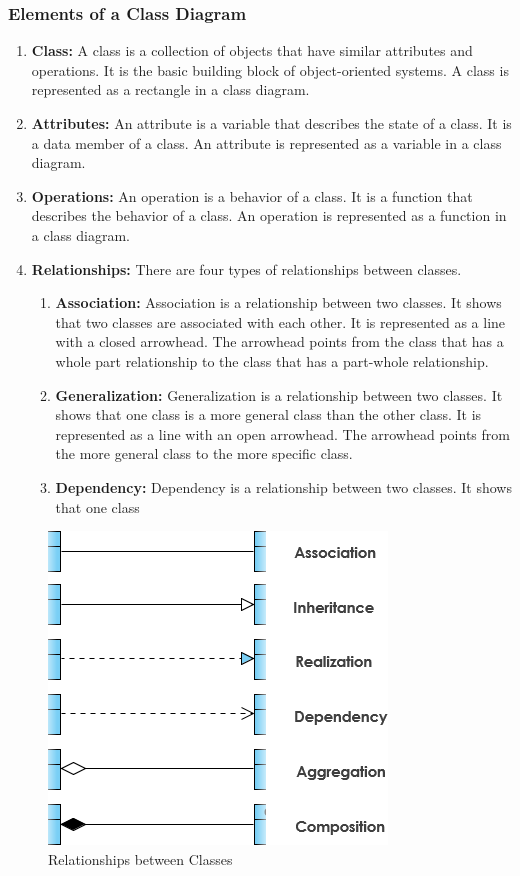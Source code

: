 \documentclass[11pt]{article}
\begin{document}
\subsubsection{Elements of a Class Diagram}

\begin{enumerate}
	\item \textbf{Class:} A class is a collection of objects that have similar attributes and operations. It is the basic building block of object-oriented systems. A class is represented as a rectangle in a class diagram.
	\item \textbf{Attributes:} An attribute is a variable that describes the state of a class. It is a data member of a class. An attribute is represented as a variable in a class diagram.
	\item \textbf{Operations:} An operation is a behavior of a class. It is a function that describes the behavior of a class. An operation is represented as a function in a class diagram.
	\item \textbf{Relationships:} There are four types of relationships between classes.
	      \begin{enumerate}
		      \item \textbf{Association:} Association is a relationship between two classes. It shows that two classes are associated with each other. It is represented as a line with a closed arrowhead. The arrowhead points from the class that has a whole part relationship to the class that has a part-whole relationship.
		      \item \textbf{Generalization:} Generalization is a relationship between two classes. It shows that one class is a more general class than the other class. It is represented as a line with an open arrowhead. The arrowhead points from the more general class to the more specific class.
		      \item \textbf{Dependency:} Dependency is a relationship between two classes. It shows that one class
	      \end{enumerate}
\end{enumerate}

\begin{figure}[H]
	\centering
	\includegraphics[scale=0.7]{07-relationships-between-classes.png}
	\caption{Relationships between Classes}
\end{figure}
\end{document}
